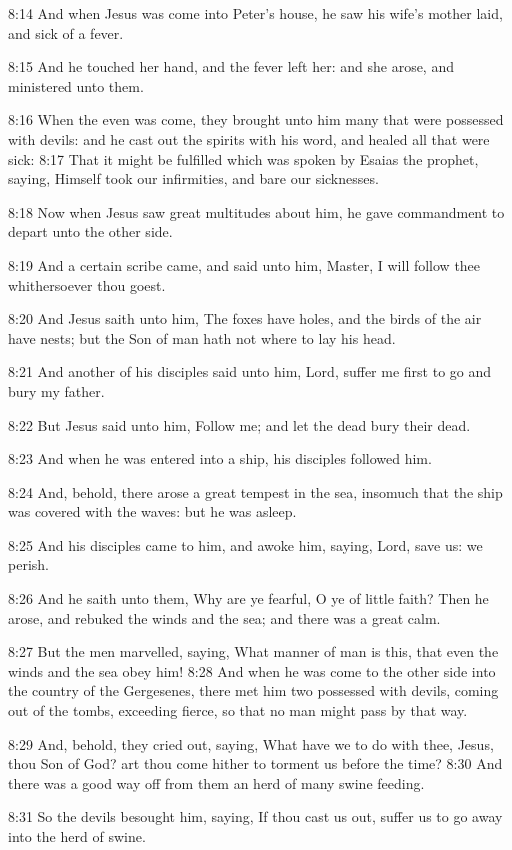 8:14 And when Jesus was come into Peter's house, he saw his wife's mother laid, and sick of a fever.

8:15 And he touched her hand, and the fever left her: and she arose, and ministered unto them.

8:16 When the even was come, they brought unto him many that were possessed with devils: and he cast out the spirits with his word, and healed all that were sick: 8:17 That it might be fulfilled which was spoken by Esaias the prophet, saying, Himself took our infirmities, and bare our sicknesses.

8:18 Now when Jesus saw great multitudes about him, he gave commandment to depart unto the other side.

8:19 And a certain scribe came, and said unto him, Master, I will follow thee whithersoever thou goest.

8:20 And Jesus saith unto him, The foxes have holes, and the birds of the air have nests; but the Son of man hath not where to lay his head.

8:21 And another of his disciples said unto him, Lord, suffer me first to go and bury my father.

8:22 But Jesus said unto him, Follow me; and let the dead bury their dead.

8:23 And when he was entered into a ship, his disciples followed him.

8:24 And, behold, there arose a great tempest in the sea, insomuch that the ship was covered with the waves: but he was asleep.

8:25 And his disciples came to him, and awoke him, saying, Lord, save us: we perish.

8:26 And he saith unto them, Why are ye fearful, O ye of little faith?  Then he arose, and rebuked the winds and the sea; and there was a great calm.

8:27 But the men marvelled, saying, What manner of man is this, that even the winds and the sea obey him!  8:28 And when he was come to the other side into the country of the Gergesenes, there met him two possessed with devils, coming out of the tombs, exceeding fierce, so that no man might pass by that way.

8:29 And, behold, they cried out, saying, What have we to do with thee, Jesus, thou Son of God? art thou come hither to torment us before the time?  8:30 And there was a good way off from them an herd of many swine feeding.

8:31 So the devils besought him, saying, If thou cast us out, suffer us to go away into the herd of swine.

